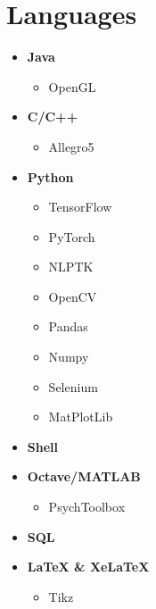 \documentclass[]{chandan-cv}
\begin{document}
\begin{minipage}[t]{0.27\textwidth}


\section{Languages}
	\begin{itemize}
		\setlength\itemsep{-0.2em}
		\item \textbf{Java}
			\begin{itemize}
				\setlength\itemsep{-0.17em}
				\item OpenGL
			\end{itemize}
		\item \textbf{C/C++}
			\begin{itemize}
				\setlength\itemsep{-0.17em}
				\item Allegro5
			\end{itemize}
		\item \textbf{Python}
			\begin{itemize}
				\setlength\itemsep{-0.17em}
				\item TensorFlow
				\item PyTorch
				\item NLPTK
				\item OpenCV
				\item Pandas
				\item Numpy
				\item Selenium
				\item MatPlotLib
			\end{itemize}
		\item \textbf{Shell}
		\item \textbf{Octave/MATLAB}
			\begin{itemize}
				\setlength\itemsep{-0.17em}
				\item PsychToolbox
			\end{itemize}
		\item \textbf{SQL}
		\item \textbf{LaTeX \& XeLaTeX}
			\begin{itemize}
				\setlength\itemsep{-0.17em}
				\item Tikz
			\end{itemize}
	\end{itemize}
\sectionsep



\end{minipage}
\end{document}
